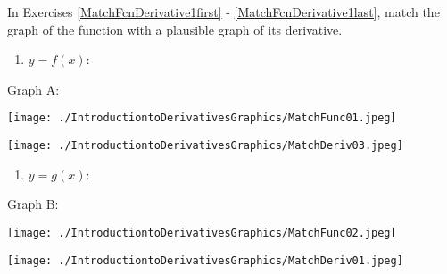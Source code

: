\documentclass{ximera}
\begin{document}
In Exercises \ref{MatchFcnDerivative1first} - \ref{MatchFcnDerivative1last}, match the graph of the function with a plausible graph of its derivative.

\begin{center}

\begin{multicols}{2}

\begin{enumerate}
\setcounter{enumi}{\value{HW}}

\item \label{MatchFcnDerivative1first}$y = f(x)$:

\setcounter{HW}{\value{enumi}}
\end{enumerate}

Graph A:

\end{multicols}


\begin{multicols}{2}

\texttt{[image: ./IntroductiontoDerivativesGraphics/MatchFunc01.jpeg]}

\texttt{[image: ./IntroductiontoDerivativesGraphics/MatchDeriv03.jpeg]}

\end{multicols}



\begin{multicols}{2}

\begin{enumerate}
\setcounter{enumi}{\value{HW}}

\item $y = g(x)$:

\setcounter{HW}{\value{enumi}}
\end{enumerate}

Graph B:

\end{multicols}

\begin{multicols}{2}

\texttt{[image: ./IntroductiontoDerivativesGraphics/MatchFunc02.jpeg]}

\texttt{[image: ./IntroductiontoDerivativesGraphics/MatchDeriv01.jpeg]}

\end{multicols}


\begin{multicols}{2}

\begin{enumerate}
\setcounter{enumi}{\value{HW}}


\end{enumerate}
\end{multicols}
\end{center}
\end{document}
